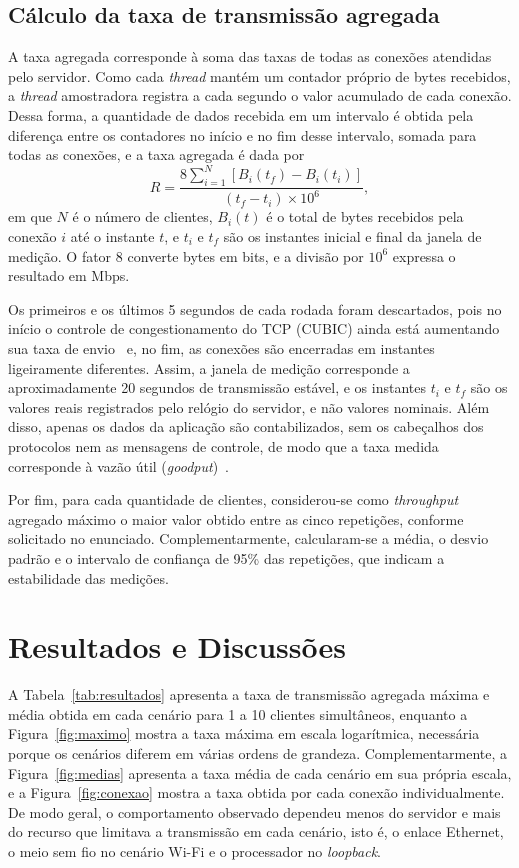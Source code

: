 \documentclass[12pt]{article}
\begin{document}
\subsection{Cálculo da taxa de transmissão agregada}

A taxa agregada corresponde à soma das taxas de todas as conexões atendidas
pelo servidor. Como cada \textit{thread} mantém um contador próprio de bytes
recebidos, a \textit{thread} amostradora registra a cada segundo o valor
acumulado de cada conexão. Dessa forma, a quantidade de dados recebida em um
intervalo é obtida pela diferença entre os contadores no início e no fim desse
intervalo, somada para todas as conexões, e a taxa agregada é dada por
\begin{equation}
R = \frac{8 \sum_{i=1}^{N} \left[ B_i(t_f) - B_i(t_i) \right]}{(t_f - t_i) \times 10^6},
\end{equation}
em que $N$ é o número de clientes, $B_i(t)$ é o total de bytes recebidos pela
conexão $i$ até o instante $t$, e $t_i$ e $t_f$ são os instantes inicial e
final da janela de medição. O fator 8 converte bytes em bits, e a divisão por
$10^6$ expressa o resultado em Mbps.

Os primeiros e os últimos 5 segundos de cada rodada foram descartados, pois no
início o controle de congestionamento do TCP (CUBIC) ainda está aumentando sua
taxa de envio~\cite{ha:08,rfc9293} e, no fim, as conexões são
encerradas em instantes ligeiramente diferentes. Assim, a janela de medição
corresponde a aproximadamente 20 segundos de transmissão estável, e os
instantes $t_i$ e $t_f$ são os valores reais registrados pelo relógio do
servidor, e não valores nominais. Além disso, apenas os dados da aplicação são
contabilizados, sem os cabeçalhos dos protocolos nem as mensagens de controle,
de modo que a taxa medida corresponde à vazão útil (\textit{goodput})~\cite{kurose:21}.

Por fim, para cada quantidade de clientes, considerou-se como
\textit{throughput} agregado máximo o maior valor obtido entre as cinco
repetições, conforme solicitado no enunciado. Complementarmente, calcularam-se
a média, o desvio padrão e o intervalo de confiança de 95\% das repetições, que
indicam a estabilidade das medições.

\section{Resultados e Discussões}\label{sec:resultados}

A Tabela~\ref{tab:resultados} apresenta a taxa de transmissão agregada máxima e
média obtida em cada cenário para 1 a 10 clientes simultâneos, enquanto a
Figura~\ref{fig:maximo} mostra a taxa máxima em escala logarítmica, necessária
porque os cenários diferem em várias ordens de grandeza. Complementarmente, a
Figura~\ref{fig:medias} apresenta a taxa média de cada cenário em sua própria
escala, e a Figura~\ref{fig:conexao} mostra a taxa obtida por cada conexão
individualmente. De modo geral, o comportamento observado dependeu menos do servidor e mais do recurso que
limitava a transmissão em cada cenário, isto é, o enlace Ethernet,
o meio sem fio no cenário Wi-Fi e o processador no \textit{loopback}.
\end{document}
